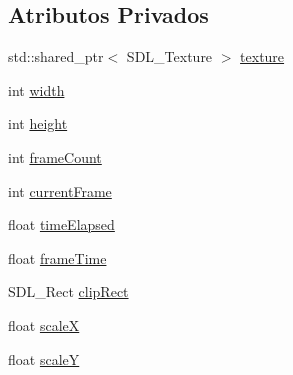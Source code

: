 \subsection*{Atributos Privados}
\begin{DoxyCompactItemize}
\item 
std\+::shared\+\_\+ptr$<$ S\+D\+L\+\_\+\+Texture $>$ \hyperlink{classSprite_a9f90b14f1a69209da8babfa6745dc1fe}{texture}
\item 
int \hyperlink{classSprite_a0a3364944c5e361fc9e7ae406224d682}{width}
\item 
int \hyperlink{classSprite_a1f07c8f2080c193759aec0e13503d7ab}{height}
\item 
int \hyperlink{classSprite_a8dc8d5c9530bad6113d37fe5e53e4668}{frame\+Count}
\item 
int \hyperlink{classSprite_a556cfc67b1b98691aa2e5b41f076fded}{current\+Frame}
\item 
float \hyperlink{classSprite_ab19d07e81660346ed85d92e518cd8399}{time\+Elapsed}
\item 
float \hyperlink{classSprite_a5d41b63da1b5ee4a734ce060ab876878}{frame\+Time}
\item 
S\+D\+L\+\_\+\+Rect \hyperlink{classSprite_a3451a65b4cd1b2ff3c11448dbdde43ac}{clip\+Rect}
\item 
float \hyperlink{classSprite_af76ca5d25866a3107bcec1d2e59f8bcb}{scale\+X}
\item 
float \hyperlink{classSprite_ac4085b0144253c09bc94151a53079104}{scale\+Y}
\end{DoxyCompactItemize}


